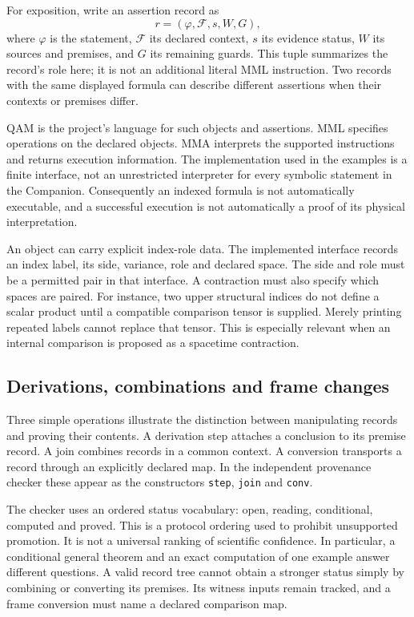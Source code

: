 \documentclass[11pt,a4paper]{article}
\begin{document}
For exposition, write an assertion record as
\begin{equation}
 r=(\varphi,\mathcal F,s,W,G),
\end{equation}
where $\varphi$ is the statement, $\mathcal F$ its declared context,
$s$ its evidence status, $W$ its sources and premises, and $G$ its
remaining guards. This tuple summarizes the record's role here; it
is not an additional literal MML instruction. Two records with the
same displayed formula can describe different assertions when their
contexts or premises differ.

QAM is the project's language for such objects and assertions. MML
specifies operations on the declared objects. MMA interprets the
supported instructions and returns execution information. The
implementation used in the examples is a finite interface, not an
unrestricted interpreter for every symbolic statement in the Companion.
Consequently an indexed formula is not automatically executable, and
a successful execution is not automatically a proof of its physical
interpretation.

An object can carry explicit index-role data. The implemented interface
records an index label, its side, variance, role and declared space.
The side and role must be a permitted pair in that interface. A
contraction must also specify which spaces are paired. For instance,
two upper structural indices do not define a scalar product until
a compatible comparison tensor is supplied. Merely printing repeated
labels cannot replace that tensor. This is especially relevant when
an internal comparison is proposed as a spacetime contraction.

\subsection{Derivations, combinations and frame changes}
Three simple operations illustrate the distinction between manipulating
records and proving their contents. A derivation step attaches a
conclusion to its premise record. A join combines records in a common
context. A conversion transports a record through an explicitly
declared map. In the independent provenance checker these appear as
the constructors \texttt{step}, \texttt{join} and \texttt{conv}.

The checker uses an ordered status vocabulary: open, reading,
conditional, computed and proved. This is a protocol ordering used
to prohibit unsupported promotion. It is not a universal ranking of
scientific confidence. In particular, a conditional general theorem
and an exact computation of one example answer different questions.
A valid record tree cannot obtain a stronger status simply by
combining or converting its premises. Its witness inputs remain
tracked, and a frame conversion must name a declared comparison map.
\end{document}

